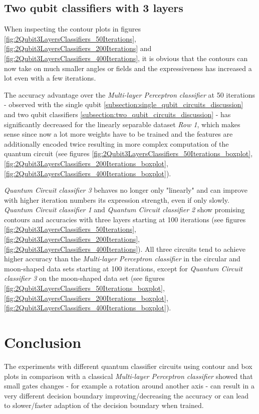 \subsection{Two qubit classifiers with 3 layers}
\label{subsection:two_qubit_3layer_circuits_discussion}

When inspecting the contour plots in figures \ref{fig:2Qubit3LayersClassifiers_50Iterations}, \ref{fig:2Qubit3LayersClassifiers_200Iterations} and \ref{fig:2Qubit3LayersClassifiers_400Iterations}, it is obvious that the contours can now take on much smaller angles or fields and the expressiveness has increased a lot even with a few iterations.

The accuracy advantage over the \textit{Multi-layer Perceptron classifier} at 50 iterations - observed with the single qubit \ref{subsection:single_qubit_circuits_discussion} and two qubit classifiers \ref{subsection:two_qubit_circuits_discussion} - has significantly decreased for the linearly separable dataset \textit{Row 1}, which makes sense since now a lot more weights have to be trained and the features are additionally encoded twice resulting in more complex computation of the quantum circuit (see figures \ref{fig:2Qubit3LayersClassifiers_50Iterations_boxplot}, \ref{fig:2Qubit3LayersClassifiers_200Iterations_boxplot}, \ref{fig:2Qubit3LayersClassifiers_400Iterations_boxplot}). 

\textit{Quantum Circuit classifier 3} behaves no longer only "linearly" and can improve with higher iteration numbers its expression strength, even if only slowly. \textit{Quantum Circuit classifier 1} and \textit{Quantum Circuit classifier 2} show promising contours and accuracies with three layers starting at 100 iterations (see figures \ref{fig:2Qubit3LayersClassifiers_50Iterations}, \ref{fig:2Qubit3LayersClassifiers_200Iterations}, \ref{fig:2Qubit3LayersClassifiers_400Iterations}). All three circuits tend to achieve higher accuracy than the \textit{Multi-layer Perceptron classifier} in the circular and moon-shaped data sets starting at 100 iterations, except for \textit{Quantum Circuit classifier 3} on the moon-shaped data set (see figures \ref{fig:2Qubit3LayersClassifiers_50Iterations_boxplot}, \ref{fig:2Qubit3LayersClassifiers_200Iterations_boxplot}, \ref{fig:2Qubit3LayersClassifiers_400Iterations_boxplot}). 

\section{Conclusion}
The experiments with different quantum classifier circuits using contour and box plots in comparison with a classical \textit{Multi-layer Perceptron classifier} showed that small gates changes - for example a rotation around another axis - can result in a very different decision boundary improving/decreasing the accuracy or can lead to slower/faster adaption of the decision boundary when trained.

